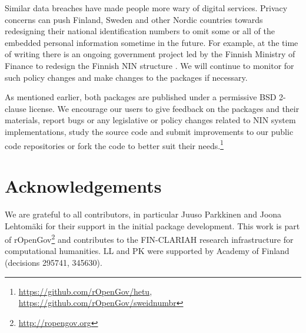 Similar data breaches have made people more wary of digital services. Privacy concerns can push Finland, Sweden and other Nordic countries towards redesigning their national identification numbers to omit some or all of the embedded personal information sometime in the future. For example, at the time of writing there is an ongoing government project led by the Finnish Ministry of Finance to redesign the Finnish NIN structure \citep{valtiovarainministerio2022}. We will continue to monitor for such policy changes and make changes to the packages if necessary.

As mentioned earlier, both packages are published under a permissive BSD 2-clause license. We encourage our users to give feedback on the packages and their materials, report bugs or any legislative or policy changes related to NIN system implementations, study the source code and submit improvements to our public code repositories or fork the code to better suit their needs.\footnote{\url{https://github.com/rOpenGov/hetu}, \url{https://github.com/rOpenGov/sweidnumbr}}

\section{Acknowledgements}

We are grateful to all contributors, in particular Juuso Parkkinen and Joona Lehtomäki for their support in the initial package development. This work is part of rOpenGov\footnote{\url{http://ropengov.org}} and contributes to the FIN-CLARIAH research infrastructure for computational humanities. LL and PK were supported by Academy of Finland (decisions 295741, 345630).



\address{Pyry Kantanen\\
  Department of Computing\\
  PO Box 20014 University of Turku\\
  Finland\\
  ORCiD: 0000-0003-2853-2765\\
  }
  
\address{Erik Bülow\\
  Department of Orthopaedics, Institute of clinical sciences\\
  Sahlgrenska Academy\\ University of Gothenburg\\
  Sweden\\
  ORCiD: 0000-0002-9973-456X\\
  }
  
